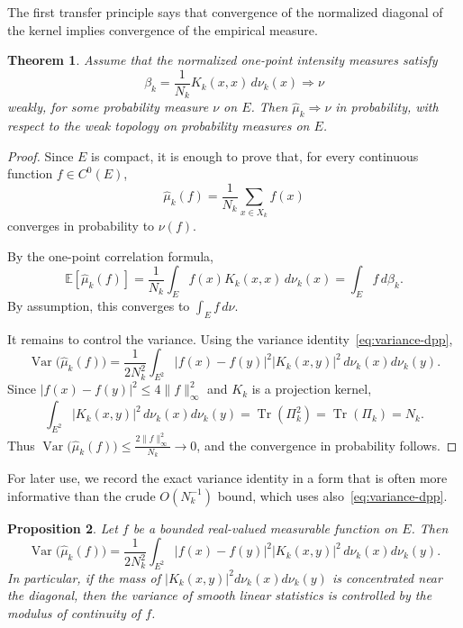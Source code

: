 \documentclass[12pt,a4paper,reqno]{article}
\theoremstyle{thmstyleone}
\newtheorem{theorem}{Theorem}[subsection]
\newtheorem{proposition}[theorem]{Proposition}
\theoremstyle{thmstylethree}
\theoremstyle{thmstyletwo}
\numberwithin{equation}{subsection}
\def\leq{\leqslant}
\begin{document}
The first transfer principle says that convergence of the normalized diagonal of the kernel implies convergence of the empirical measure.

\begin{theorem}\label{thm:diagonal-transfer}
Assume that the normalized one-point intensity measures satisfy
\[
    \beta_k
    =
    \frac{1}{N_k}K_k(x,x)\,d\nu_k(x)
    \Longrightarrow
    \nu
\]
weakly, for some probability measure $\nu$ on $E$. Then $\widehat\mu_k\Longrightarrow\nu$ in probability, with respect to the weak topology on probability measures on
$E$.
\end{theorem}

\begin{proof}
Since $E$ is compact, it is enough to prove that, for every continuous function $f\in C^0(E)$,
\[
    \widehat\mu_k(f)
    =
    \frac{1}{N_k}\sum_{x\in X_k}f(x)
\]
converges in probability to $\nu(f)$.

By the one-point correlation formula,
\[
    \mathbb E[\widehat\mu_k(f)]
    =
    \frac{1}{N_k}\int_E f(x)K_k(x,x)\,d\nu_k(x)
    =
    \int_E f\,d\beta_k.
\]
By assumption, this converges to $\int_E f\,d\nu$.

It remains to control the variance. Using the variance identity~\eqref{eq:variance-dpp},
\[
    \operatorname{Var}\big(\widehat\mu_k(f)\big)
    =
    \frac{1}{2N_k^2}
    \int_{E^2}
        |f(x)-f(y)|^2|K_k(x,y)|^2
        \,d\nu_k(x)d\nu_k(y).
\]
Since $|f(x)-f(y)|^2\leq 4\|f\|_\infty^2$ and $K_k$ is a projection kernel,
\[
    \int_{E^2}|K_k(x,y)|^2\,d\nu_k(x)d\nu_k(y)
    =
    \operatorname{Tr}(\Pi_k^2)
    =
    \operatorname{Tr}(\Pi_k)
    =
    N_k.
\]
Thus $\operatorname{Var}\big(\widehat\mu_k(f)\big)\leq\frac{2\|f\|_\infty^2}{N_k}\longrightarrow 0$, and the convergence in probability follows.
\end{proof}

For later use, we record the exact variance identity in a form that is often more informative than the crude $O(N_k^{-1})$ bound, which uses also~\eqref{eq:variance-dpp}.

\begin{proposition}\label{prop:variance-transfer}
Let $f$ be a bounded real-valued measurable function on $E$. Then
\[
    \operatorname{Var}\big(\widehat\mu_k(f)\big)
    =
    \frac{1}{2N_k^2}
    \int_{E^2}
        |f(x)-f(y)|^2
        |K_k(x,y)|^2
        \,d\nu_k(x)d\nu_k(y).
\]
In particular, if the mass of $|K_k(x,y)|^2d\nu_k(x)d\nu_k(y)$ is concentrated near the diagonal, then the variance of smooth linear statistics is controlled by the modulus of continuity of $f$.
\end{proposition}
\end{document}
